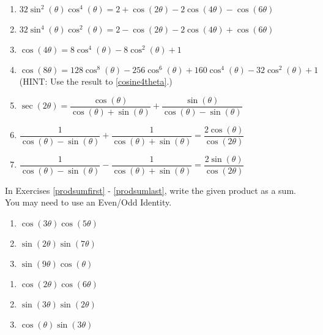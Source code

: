 \begin{enumerate}

\setcounter{enumi}{\value{HW}}

\item  $32\sin^{2}(\theta) \cos^{4}(\theta) = 2 + \cos(2\theta) - 2\cos(4\theta) - \cos(6\theta)$
\item  $32\sin^{4}(\theta) \cos^{2}(\theta) = 2 - \cos(2\theta) - 2\cos(4\theta) + \cos(6\theta)$
\item \label{cosine4theta} $\cos(4\theta) = 8\cos^{4}(\theta) - 8\cos^{2}(\theta) + 1$
\item  $\cos(8\theta) = 128\cos^{8}(\theta)-256\cos^{6}(\theta)+160\cos^{4}(\theta)-32\cos^{2}(\theta)+1$ (HINT:  Use the result to \ref{cosine4theta}.)
\item  $\sec(2\theta) = \dfrac{\cos(\theta)}{\cos(\theta) + \sin(\theta)} + \dfrac{\sin(\theta)}{\cos(\theta)-\sin(\theta)}$ 
\item  $\dfrac{1}{\cos(\theta) - \sin(\theta)} + \dfrac{1}{\cos(\theta) + \sin(\theta)} = \dfrac{2\cos(\theta)}{\cos(2\theta)}$
\item  $\dfrac{1}{\cos(\theta) - \sin(\theta)} - \dfrac{1}{\cos(\theta) + \sin(\theta)} = \dfrac{2\sin(\theta)}{\cos(2\theta)}$ \label{moreidentlast}

\setcounter{HW}{\value{enumi}}

\end{enumerate}

\pagebreak

In Exercises \ref{prodsumfirst} - \ref{prodsumlast}, write the given product as a sum.  You may need to use an Even/Odd Identity.

\begin{multicols}{3}

\begin{enumerate}

\setcounter{enumi}{\value{HW}}

\item $\cos(3\theta)\cos(5\theta)$ \label{prodsumfirst}
\item $\sin(2\theta)\sin(7\theta)$
\item $\sin(9\theta)\cos(\theta)$

\setcounter{HW}{\value{enumi}}

\end{enumerate}

\end{multicols}

\begin{multicols}{3}

\begin{enumerate}

\setcounter{enumi}{\value{HW}}

\item $\cos(2\theta) \cos(6\theta)$
\item $\sin(3\theta) \sin(2\theta)$
\item $\cos(\theta) \sin(3\theta)$ \label{prodsumlast}

\setcounter{HW}{\value{enumi}}

\end{enumerate}

\end{multicols}


